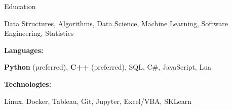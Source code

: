 \documentclass{resume}
\begin{document}
\begin{rSection}{Education}
\begin{adjustwidth}{3.5em}{0pt}
    Data Structures,
    Algorithms,
    Data Science,
    \href{https://github.com/Spelkington/mlearning}{Machine Learning},
    Software Engineering,
    Statistics
    
\end{adjustwidth}


%
%   
%
%
%
\vspace{-0.4em}
{\bf Languages:}
\vspace{-1.83em}
\begin{adjustwidth}{6em}{0pt}
    {\bf Python} (preferred), 
    {\bf C++} (preferred),
    SQL,
    C\#,
    JavaScript,
    Lua
\end{adjustwidth}

%
%
%
\vspace{-3pt}
{\bf Technologies:}
\vspace{-1.83em}
\begin{adjustwidth}{7em}{0pt}
    Linux,
    Docker,
    Tableau,
    Git,
    Jupyter,
    Excel/VBA,
    SKLearn

\end{adjustwidth}

\end{rSection}
\end{document}
